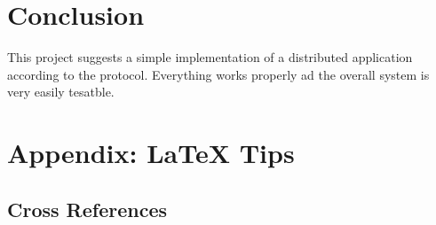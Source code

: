 \documentclass[conference]{IEEEtran}
\begin{document}

\section{Conclusion}
This project suggests a simple implementation of a distributed application
according to the protocol. Everything works properly ad the overall system
is very easily tesatble. 

\section{Appendix: \LaTeX\xspace Tips}

\subsection{Cross References}
\label{sec:cross-ref}

\end{document}
